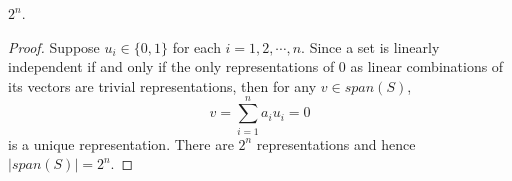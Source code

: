 \begin{Exercise}
\begin{answer}
$2^n$.
\end{answer}
\begin{proof}
Suppose $u_i\in \{0,1\}$ for each $i=1,2,\cdots,n$. Since a set is linearly independent if and only if the only representations of $0$ as linear combinations of its vectors are trivial representations, then for any $v\in span(S)$,
$$
v = \sum_{i=1}^{n}a_i u_i = 0
$$
is a unique representation. There are $2^n$ representations and hence $\left|span(S)\right| = 2^n$.
\end{proof}
\end{Exercise}